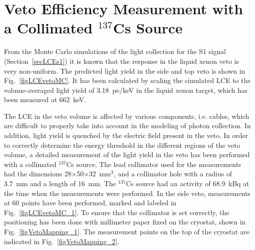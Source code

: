 \section{Veto Efficiency Measurement with a Collimated $^{137}$Cs Source}
\label{secVetoEfficiencyMeasurement}


From the Monte Carlo simulations of the light collection for the S1 signal (Section~\ref{secLCEs1}) it is known that the response in the liquid xenon veto is very non-uniform. The predicted light yield in the side and top veto is shown in Fig.~\ref{figLCEvetoMC}. It has been calculated by scaling the simulated LCE to the volume-averaged light yield of 3.18~pe/keV in the liquid xenon target, which has been measured at 662~keV. 

The LCE in the veto volume is affected by various components, i.e. cables, which are difficult to properly take into account in the modeling of photon collection. In addition, light yield is quenched by the electric field present in the veto. 
In order to correctly determine the energy threshold in the different regions of the veto volume, a detailed measurement of the light yield in the veto has been performed with a collimated $^{137}$Cs source. 
The lead collimator used for the measurements had the dimensions 28$\times$50$\times$32~mm$^{3}$, and a collimator hole with a radius of 3.7~mm and a length of 16~mm. The $^{137}$Cs source had an activity of 68.9~kBq at the time when the measurements were performed. 
In the side veto, measurements at 60 points have been performed, marked and labeled in Fig.~\ref{figLCEvetoMC_1}. To ensure that the collimator is set correctly, the positioning has been done with millimeter paper fixed on the cryostat, shown in Fig.~\ref{figVetoMapping_1}. The measurement points on the top of the cryostat are indicated in Fig.~\ref{figVetoMapping_2}.

